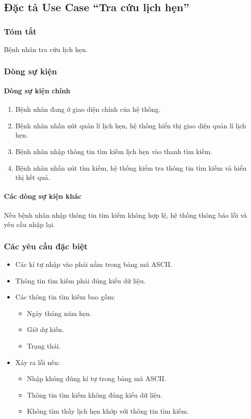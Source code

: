 \subsection{Đặc tả Use Case ``Tra cứu lịch hẹn''}

\subsubsection{Tóm tắt}
Bệnh nhân tra cứu lịch hẹn.

\subsubsection{Dòng sự kiện}
\paragraph{\textbf{Dòng sự kiện chính}}
\begin{enumerate}
  \item Bệnh nhân đang ở giao diện chính của hệ thống.
  \item Bệnh nhân nhấn nút quản lí lịch hẹn, hệ thống hiển thị giao diện quản lí lịch hẹn.
  \item Bệnh nhân nhập thông tin tìm kiếm lịch hẹn vào thanh tìm kiếm.
  \item Bệnh nhân nhấn nút tìm kiếm, hệ thống kiểm tra thông tin tìm kiếm và hiển thị kết quả.
\end{enumerate}

\paragraph{\textbf{Các dòng sự kiện khác}}
Nếu bệnh nhân nhập thông tin tìm kiếm không hợp lệ, hệ thống thông báo lỗi và yêu cầu nhập lại.

\subsubsection{Các yêu cầu đặc biệt}
\begin{itemize}
  \item Các kí tự nhập vào phải nằm trong bảng mã ASCII.
  \item Thông tin tìm kiếm phải đúng kiểu dữ liệu.
  \item Các thông tin tìm kiếm bao gồm:
    \begin{itemize}
      \item Ngày tháng năm hẹn.
      \item Giờ dự kiến.
      \item Trạng thái.
    \end{itemize}
  \item Xảy ra lỗi nếu:
    \begin{itemize}
      \item Nhập không đúng kí tự trong bảng mã ASCII.
      \item Thông tin tìm kiếm không đúng kiểu dữ liệu.
      \item Không tìm thấy lịch hẹn khớp với thông tin tìm kiếm.
    \end{itemize}
\end{itemize}

